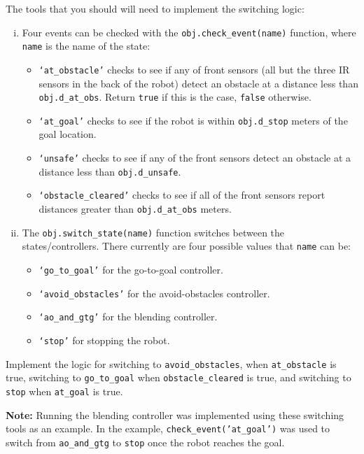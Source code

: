 \documentclass[10pt]{article}
\begin{document}
\begin{enumerate}
  The tools that you should will need to implement the switching logic:
  \begin{enumerate}[(i)]
    \item Four events can be checked with the \texttt{obj.check\_event(name)} function, where \texttt{name} is the name of the state:
      \begin{itemize}
        \item \texttt{`at\_obstacle'} checks to see if any of front sensors (all but the three IR sensors in the back of the robot) detect an obstacle at a distance less than \texttt{obj.d\_at\_obs}. Return \texttt{true} if this is the case, \texttt{false} otherwise.
        \item \texttt{`at\_goal'} checks to see if the robot is within \texttt{obj.d\_stop} meters of the goal location.
        \item \texttt{`unsafe'} checks to see if any of the front sensors detect an obstacle at a distance less than \texttt{obj.d\_unsafe}.
        \item \texttt{`obstacle\_cleared'} checks to see if all of the front sensors report distances greater than \texttt{obj.d\_at\_obs} meters.
      \end{itemize}
    \item The \texttt{obj.switch\_state(name)} function switches between the states/controllers. There currently are four possible values that \texttt{name} can be:
      \begin{itemize}
        \item \texttt{`go\_to\_goal'} for the go-to-goal controller.
        \item \texttt{`avoid\_obstacles'} for the avoid-obstacles controller.
        \item \texttt{`ao\_and\_gtg'} for the blending controller.
        \item \texttt{`stop'} for stopping the robot.
      \end{itemize}
  \end{enumerate}
  
  Implement the logic for switching to \texttt{avoid\_obstacles}, when \texttt{at\_obstacle} is true, switching to \texttt{go\_to\_goal} when \texttt{obstacle\_cleared} is true, and switching to \texttt{stop} when \texttt{at\_goal} is true. 
  
  
  \textbf{Note:} Running the blending controller was implemented using these switching tools as an example. In the example, \texttt{check\_event('at\_goal')} was used to switch from \texttt{ao\_and\_gtg} to \texttt{stop} once the robot reaches the goal.
  

\end{enumerate}
\end{document}
